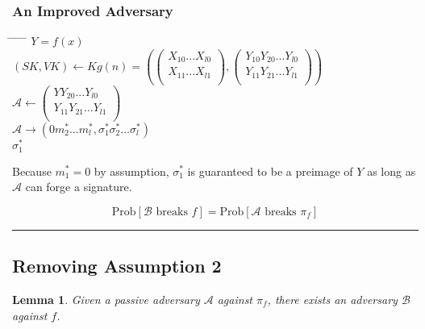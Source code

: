 \documentclass[twoside]{article}
\newtheorem{lemma}[theorem]{Lemma}
\newenvironment{proof}{{\bf Proof:}}{\hfill\rule{2mm}{2mm}}
\begin{document}
\begin{proof}
\subsubsection{An Improved Adversary}

\begin{tabbing}
\hspace*{.25in} \= \hspace*{.25in} \= \hspace*{.25in} \= \hspace*{.25in} \= \hspace*{.25in} \=\kill
{} $Y = f(x)$\\
\>$(SK, VK) \leftarrow Kg(n) = \left(
\begin{pmatrix}
X_{10}...X_{l0}\\
X_{11}...X_{l1}\\
\end{pmatrix},
\begin{pmatrix}
Y_{10}Y_{20}...Y_{l0}\\
Y_{11}Y_{21}...Y_{l1}\\
\end{pmatrix}\right)$\\
\>$\mathcal{A} \leftarrow
\begin{pmatrix}
YY_{20}...Y_{l0}\\
Y_{11}Y_{21}...Y_{l1}\\
\end{pmatrix}$\\
\>$\mathcal{A} \rightarrow (0m^*_2...m^*_l,\sigma^*_1\sigma^*_2...\sigma^*_l)$\\
 $\sigma^*_1$
\end{tabbing}

Because $m^*_1 = 0$ by assumption, $\sigma^*_1$ is guaranteed to be a preimage of $Y$ as long as $\mathcal{A}$ can forge a signature.

$$\text{Prob}[\mathcal{B}\text{ breaks }f] = \text{Prob}[\mathcal{A}\text{ breaks }\pi_f]$$
\end{proof}

\subsection{Removing Assumption 2}

\begin{lemma}
Given a passive adversary $\mathcal{A}$ against $\pi_f$, there exists an adversary $\mathcal{B}$ against $f$.
\end{lemma}
\end{document}
